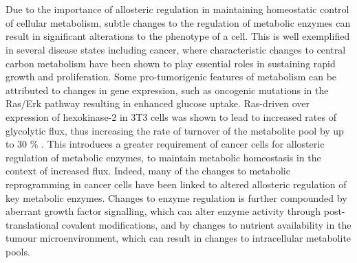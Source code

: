 %
%
\\\\
%
%
Due to the importance of allosteric regulation in maintaining homeostatic control of cellular metabolism, subtle changes to the regulation of metabolic enzymes can result in significant alterations to the phenotype of a cell. This is well exemplified in several disease states including cancer, where characteristic changes to central carbon metabolism have been shown to play essential roles in sustaining rapid growth and proliferation. Some pro-tumorigenic features of metabolism can be attributed to changes in gene expression, such as oncogenic mutations in the Ras/Erk pathway resulting in enhanced glucose uptake. Ras-driven over expression of hexokinase-2 in 3T3 cells was shown to lead to increased rates of glycolytic flux, thus increasing the rate of turnover of the metabolite pool by up to 30 \% \cite{Tanner:2018aa}. This introduces a greater requirement of cancer cells for allosteric regulation of metabolic enzymes, to maintain metabolic homeostasis in the context of increased flux. Indeed, many of the changes to metabolic reprogramming in cancer cells have been linked to altered allosteric regulation of key metabolic enzymes. Changes to enzyme regulation is further compounded by aberrant growth factor signalling, which can alter enzyme activity through post-translational covalent modifications, and by changes to nutrient availability in the tumour microenvironment, which can result in changes to intracellular metabolite pools. 

\clearpage


